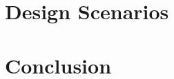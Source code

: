 \documentclass[acmtog]{acmart}
\begin{document}
\section{Design Scenarios}




\section{Conclusion}



\end{document}
